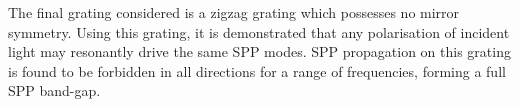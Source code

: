 \begin{abstracts}
The final grating considered is a zigzag grating which possesses no mirror symmetry. Using this grating, it is demonstrated that any polarisation of incident light may resonantly drive the same SPP modes. SPP propagation on this grating is found to be forbidden in all directions for a range of frequencies, forming a full SPP band-gap.

\end{abstracts}




